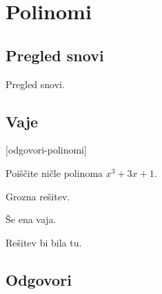 \chapter{Polinomi}
\label{cha:polinomi}

\section{Pregled snovi}
\label{sec:polinomi-pregled-snovi}

Pregled snovi.

\section{Vaje}
\label{sec:polinomi-funkcije-vaje}


\def\datotekaOdgovori{odgovori-polinomi}

[\datotekaOdgovori]

%

\begin{vaja}
  Poiščite ničle polinoma $x^3 + 3 x + 1$.

  \begin{odgovor}
    Grozna rešitev.
  \end{odgovor}
\end{vaja}

\begin{vaja}
  Še ena vaja.

  \begin{odgovor}
    Rešitev bi bila tu.
  \end{odgovor}
\end{vaja}




\section{Odgovori}
\label{sec:polinomi-odgovori}




